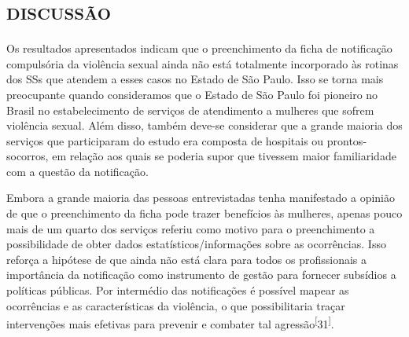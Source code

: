 \documentclass{article}
\begin{document}
\section{\textsc{discussão}}

Os resultados apresentados indicam que o preenchimento da ficha de notificação
compulsória da violência sexual ainda não está totalmente incorporado às rotinas
dos SSs que atendem a esses casos no Estado de São Paulo. Isso se torna mais
preocupante quando consideramos que o Estado de São Paulo foi pioneiro no Brasil
no estabelecimento de serviços de atendimento a mulheres que sofrem violência
sexual. Além disso, também deve-se considerar que a grande maioria dos serviços
que participaram do estudo era composta de hospitais ou prontos-socorros, em
relação aos quais se poderia supor que tivessem maior familiaridade com a
questão da notificação.

Embora a grande maioria das pessoas entrevistadas tenha manifestado a opinião de
que o preenchimento da ficha pode trazer benefícios às mulheres, apenas pouco
mais de um quarto dos serviços referiu como motivo para o preenchimento a
possibilidade de obter dados estatísticos/informações sobre as ocorrências. Isso
reforça a hipótese de que ainda não está clara para todos os profissionais a
importância da notificação como instrumento de gestão para fornecer subsídios a
políticas públicas. Por intermédio das notificações é possível mapear as
ocorrências e as características da violência, o que possibilitaria traçar
intervenções mais efetivas para prevenir e combater tal
agressão\textsuperscript{[}31\textsuperscript{]}.
\end{document}
